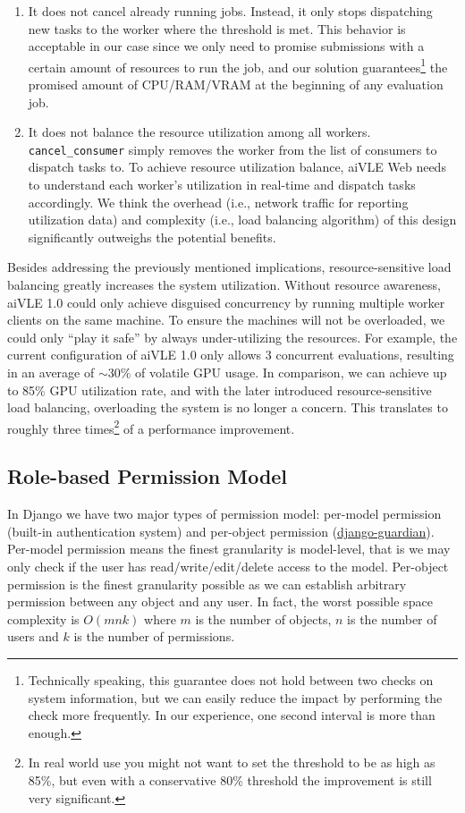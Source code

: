 \begin{enumerate}
    \item It does not cancel already running jobs. Instead, it only stops dispatching new tasks to the worker where the threshold is met. This behavior is acceptable in our case since we only need to promise submissions with a certain amount of resources to run the job, and our solution guarantees\footnote{Technically speaking, this guarantee does not hold between two checks on system information, but we can easily reduce the impact by performing the check more frequently. In our experience, one second interval is more than enough.} the promised amount of CPU/RAM/VRAM at the beginning of any evaluation job.
    \item It does not balance the resource utilization among all workers. \texttt{cancel\_consumer} simply removes the worker from the list of consumers to dispatch tasks to. To achieve resource utilization balance, aiVLE Web needs to understand each worker's utilization in real-time and dispatch tasks accordingly. We think the overhead (i.e., network traffic for reporting utilization data) and complexity (i.e., load balancing algorithm) of this design significantly outweighs the potential benefits.
\end{enumerate}

Besides addressing the previously mentioned implications, resource-sensitive load balancing greatly increases the system utilization. Without resource awareness, aiVLE 1.0 could only achieve disguised concurrency by running multiple worker clients on the same machine. To ensure the machines will not be overloaded, we could only ``play it safe'' by always under-utilizing the resources. For example, the current configuration of aiVLE 1.0 only allows 3 concurrent evaluations, resulting in an average of $\sim30\%$ of volatile GPU usage. In comparison, we can achieve up to 85\% GPU utilization rate, and with the later introduced resource-sensitive load balancing, overloading the system is no longer a concern. This translates to roughly three times\footnote{In real world use you might not want to set the threshold to be as high as 85\%, but even with a conservative 80\% threshold the improvement is still very significant.} of a performance improvement.

\subsection{Role-based Permission Model}
\label{ss:aivle-web-permission-model}
In Django we have two major types of permission model: per-model permission (built-in authentication system) and per-object permission (\href{https://github.com/django-guardian/django-guardian}{django-guardian}). Per-model permission means the finest granularity is model-level, that is we may only check if the user has read/write/edit/delete access to the model. Per-object permission is the finest granularity possible as we can establish arbitrary permission between any object and any user. In fact, the worst possible space complexity is $O(mnk)$ where $m$ is the number of objects, $n$ is the number of users and $k$ is the number of permissions.

